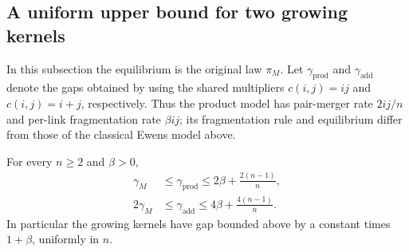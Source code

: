 \subsection{A uniform upper bound for two growing kernels}
\label{sec:growing-kernel-upper}

In this subsection the equilibrium is the original law $\pi_M$.
Let $\gamma_{\mathrm{prod}}$ and $\gamma_{\mathrm{add}}$ denote the
gaps obtained by using the shared multipliers $c(i,j)=ij$ and
$c(i,j)=i+j$, respectively.
Thus the product model has pair-merger rate $2ij/n$ and per-link
fragmentation rate $\beta ij$; its fragmentation rule and equilibrium
differ from those of the classical Ewens model above.

\begin{proposition}\label{prop:growing-kernel-upper}
For every $n\ge2$ and $\beta>0$,
\begin{align}
 \gamma_M
 &\le\gamma_{\mathrm{prod}}
       \le 2\beta+\frac{2(n-1)}n,\label{eq:product-kernel-bounds}\\
 2\gamma_M
 &\le\gamma_{\mathrm{add}}
       \le 4\beta+\frac{4(n-1)}n.\label{eq:additive-kernel-bounds}
\end{align}
In particular the growing kernels have gap bounded above by a
constant times $1+\beta$, uniformly in $n$.
\end{proposition}

